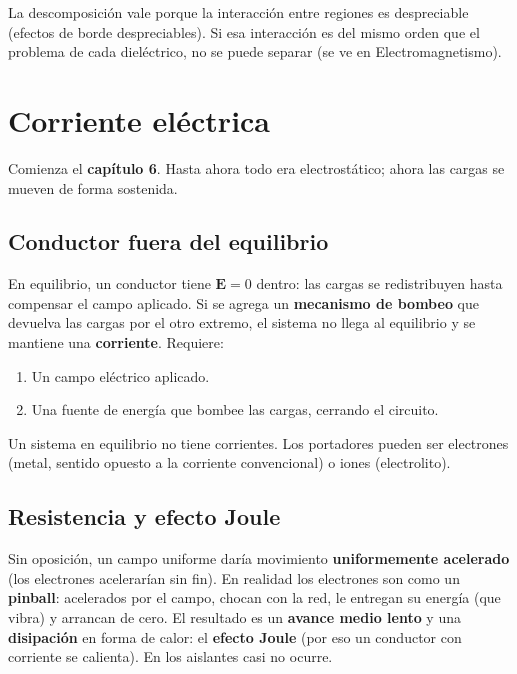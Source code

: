 \documentclass[12pt,a4paper]{article}
\begin{document}
\begin{warnbox}
  La descomposición vale porque la interacción entre regiones es
  despreciable (efectos de borde despreciables). Si esa interacción es
  del mismo orden que el problema de cada dieléctrico, no se puede
  separar (se ve en Electromagnetismo).
\end{warnbox}



\section{Corriente eléctrica}

Comienza el \textbf{capítulo 6}. Hasta ahora todo era electrostático;
ahora las cargas se mueven de forma sostenida.

\subsection{Conductor fuera del equilibrio}

En equilibrio, un conductor tiene $\mathbf{E}=0$ dentro: las cargas se
redistribuyen hasta compensar el campo aplicado. Si se agrega un
\textbf{mecanismo de bombeo} que devuelva las cargas por el otro
extremo, el sistema no llega al equilibrio y se mantiene una
\textbf{corriente}. Requiere:
\begin{enumerate}[nosep]
  \item Un campo eléctrico aplicado.
  \item Una fuente de energía que bombee las cargas, cerrando el
        circuito.
\end{enumerate}

\begin{notebox}
  Un sistema en equilibrio no tiene corrientes. Los portadores pueden ser
  electrones (metal, sentido opuesto a la corriente convencional) o iones
  (electrolito).
\end{notebox}

\subsection{Resistencia y efecto Joule}

Sin oposición, un campo uniforme daría movimiento \textbf{uniformemente
acelerado} (los electrones acelerarían sin fin). En realidad los
electrones son como un \textbf{pinball}: acelerados por el campo, chocan
con la red, le entregan su energía (que vibra) y arrancan de cero. El
resultado es un \textbf{avance medio lento} y una \textbf{disipación} en
forma de calor: el \textbf{efecto Joule} (por eso un conductor con
corriente se calienta). En los aislantes casi no ocurre.
\end{document}
